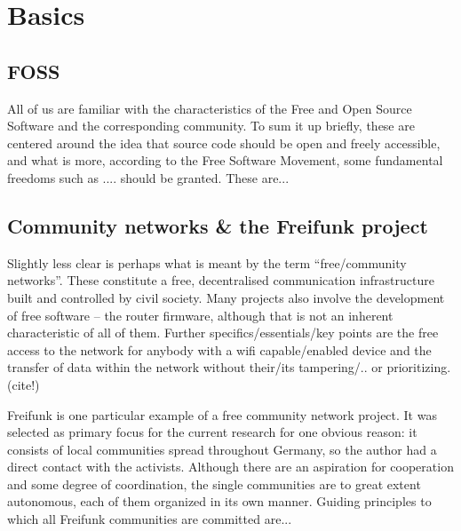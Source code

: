 \section{Basics}
\subsection{FOSS}
All of us are familiar with the characteristics of the Free and Open Source Software and the corresponding community.
To sum it up briefly, these are centered around the idea that source code should be open and freely accessible, and what is more, according to the Free Software Movement, some fundamental freedoms such as .... should be granted.
These are...

\begin{comment}
* ... to run the program as you wish, for any purpose (freedom 0).
* ... to study how the program works, and change it so it does your computing as you wish (freedom 1).
* ... to redistribute copies ... (freedom 2).
* ... to distribute copies of your modified versions to others (freedom 3).
\end{comment}


\subsection{Community networks \& the Freifunk project}
Slightly less clear is perhaps what is meant by the term ``free/community networks''. %
These constitute a free, decentralised communication infrastructure built and controlled by civil society.
Many projects also involve the development of free software -- the router firmware, although that is not an inherent characteristic of all of them.
Further specifics/essentials/key points are the free access to the network for anybody with a wifi capable/enabled device and the transfer of data within the network without their/its tampering/.. or prioritizing. (cite!)

Freifunk is one particular example of a free community network project.
It was selected as primary focus for the current research for one obvious reason: it consists of local communities spread throughout Germany, so the author had a direct contact with the activists.
Although there are an aspiration for cooperation and some degree of coordination, the single communities are to great extent autonomous, each of them organized in its own manner.
Guiding principles to which all Freifunk communities are committed are...

